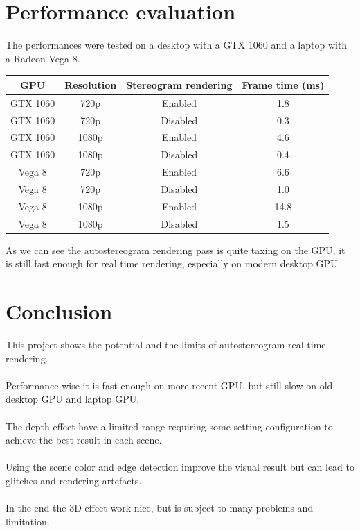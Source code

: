 \documentclass[12pt, a4paper]{article}
\begin{document}
\section{Performance evaluation}
The performances were tested on a desktop with a GTX 1060 and a laptop with a Radeon Vega 8.
\begin{center}
    \begin{tabular}{||c c c c||} 
     \hline
     GPU & Resolution & Stereogram rendering & Frame time (ms) \\
     \hline\hline
     GTX 1060 & 720p & Enabled & 1.8 \\ 
     \hline
     GTX 1060 & 720p & Disabled & 0.3 \\ 
     \hline
     GTX 1060 & 1080p & Enabled & 4.6 \\ 
     \hline
     GTX 1060 & 1080p & Disabled & 0.4 \\ 
     \hline
     Vega 8 & 720p & Enabled & 6.6 \\ 
     \hline
     Vega 8 & 720p & Disabled & 1.0 \\ 
     \hline
     Vega 8 & 1080p & Enabled & 14.8 \\ 
     \hline
     Vega 8 & 1080p & Disabled & 1.5 \\ 
     \hline    
    \end{tabular}
\end{center}
As we can see the autostereogram rendering pass is quite taxing on the GPU, it is still
fast enough for real time rendering, especially on modern desktop GPU. 

\section{Conclusion}
This project shows the potential and the limits of autostereogram real time rendering.\\\\
Performance wise it is fast enough on more recent GPU, but still slow on old desktop GPU and laptop GPU.\\\\
The depth effect have a limited range requiring some setting configuration to achieve the best result in each scene.\\\\
Using the scene color and edge detection improve the visual result but can lead to glitches and rendering artefacts.\\\\
In the end the 3D effect work nice, but is subject to many problems and limitation.
\end{document}
